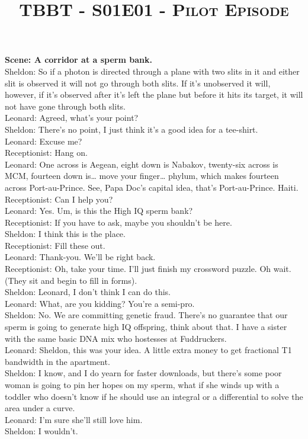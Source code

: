 \documentclass[a4paper,12pt]{article}
\title{
\vspace{-3em}
\begin{tcolorbox}[colframe=white,opacityback=0]
\begin{tcolorbox}
\Huge\scshape TBBT - S01E01 - Pilot Episode  
\end{tcolorbox}
\end{tcolorbox}
\vspace{-3em}
}
\date{}
\begin{document}
 
\maketitle

\topic{}%
{
{\Large \textbf{Scene: A corridor at a sperm bank.
}}\\Sheldon: So if a photon is directed through a plane with two slits in it and either slit is observed it will not go through both slits. If it’s unobserved it will, however, if it’s observed after it’s left the plane but before it hits its target, it will not have gone through both slits.
\\Leonard: Agreed, what’s your point?
\\Sheldon: There’s no point, I just think it’s a good idea for a tee-shirt.
\\Leonard: Excuse me?
\\Receptionist: Hang on.
\\Leonard: One across is Aegean, eight down is Nabakov, twenty-six across is MCM, fourteen down is… move your finger… phylum, which makes fourteen across Port-au-Prince. See, Papa Doc’s capital idea, that’s Port-au-Prince. Haiti.
\\Receptionist: Can I help you?
\\Leonard: Yes. Um, is this the High IQ sperm bank?
\\Receptionist: If you have to ask, maybe you shouldn’t be here.
\\Sheldon: I think this is the place.
\\Receptionist: Fill these out.
\\Leonard: Thank-you. We’ll be right back.
\\Receptionist: Oh, take your time. I’ll just finish my crossword puzzle. Oh wait.
\\(They sit and begin to fill in forms).
\\Sheldon: Leonard, I don’t think I can do this.
\\Leonard: What, are you kidding? You’re a semi-pro.
\\Sheldon: No. We are committing genetic fraud. There’s no guarantee that our sperm is going to generate high IQ offspring, think about that. I have a sister with the same basic DNA mix who hostesses at Fuddruckers.
\\Leonard: Sheldon, this was your idea. A little extra money to get fractional T1 bandwidth in the apartment.
\\Sheldon: I know, and I do yearn for faster downloads, but there’s some poor woman is going to pin her hopes on my sperm, what if she winds up with a toddler who doesn’t know if he should use an integral or a differential to solve the area under a curve.
\\Leonard: I’m sure she’ll still love him.
\\Sheldon: I wouldn’t.
}%
\end{document}
